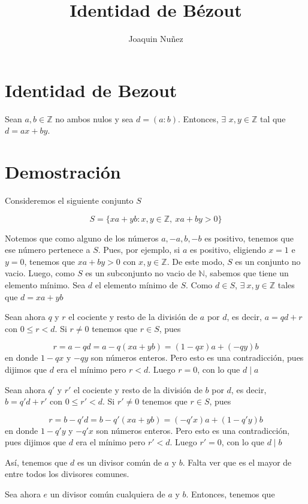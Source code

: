 \documentclass[]{article}
\title{Identidad de Bézout}
\author{Joaquin Nuñez}
\begin{document}
\maketitle



\section{Identidad de Bezout}
Sean $a, b \in \mathbb{Z}$ no ambos nulos y sea $d=(a:b)$. Entonces, $\exists$ $x, y \in \mathbb{Z}$ tal que $d=ax + by$.


\section{Demostración}

Consideremos el siguiente conjunto $S$

$$
	S =\{xa+yb: x,y \in \mathbb{Z}, ~ xa+by>0\}	
$$

Notemos que como alguno de los números $a,-a,b,-b$ es positivo, tenemos que ese número pertenece a $S$. Pues, por ejemplo, si $a$ es positivo, eligiendo $x=1$ e $y=0$, tenemos que $xa+by > 0$ con $x,y \in \mathbb{Z}$. De este modo, $S$ es un conjunto no vacio. Luego, como $S$ es un subconjunto no vacio de $\mathbb{N}$, sabemos que tiene un elemento mínimo. Sea $d$ el elemento mínimo de $S$. Como $d \in S$, $\exists ~ x,y \in \mathbb{Z}$ tales que $d=xa+yb$

Sean ahora $q$ y $r$ el cociente y resto de la división de $a$ por $d$, es decir, $a=qd+r$ con $0 \leq r < d$. Si $r \neq 0$ tenemos que $r \in S$, pues

$$
r=a-qd=a-q(xa+yb)=(1-qx)a+(-qy)b
$$
en donde $1-qx$ y $-qy$ son números enteros. Pero esto es una contradicción, pues dijimos que $d$ era el mínimo pero $r <d$. Luego $r=0$, con lo que $d \mid a$

Sean ahora $q'$ y $r'$ el cociente y resto de la división de $b$ por $d$, es decir, $b=q'd+r'$ con $0 \leq r' < d$. Si $r' \neq 0$ tenemos que $r \in S$, pues

$$
r=b-q'd=b-q'(xa+yb)=(-q'x)a+(1-q'y)b
$$
en donde $1-q'y$ y $-q'x$ son números enteros. Pero esto es una contradicción, pues dijimos que $d$ era el mínimo pero $r' <d$. Luego $r'=0$, con lo que $d \mid b$

Así, tenemos que $d$ es un divisor común de $a$ y $b$. Falta ver que es el mayor de entre todos los divisores comunes.

Sea ahora $e$ un divisor común cualquiera de $a$ y $b$. Entonces, tenemos que
\end{document}
